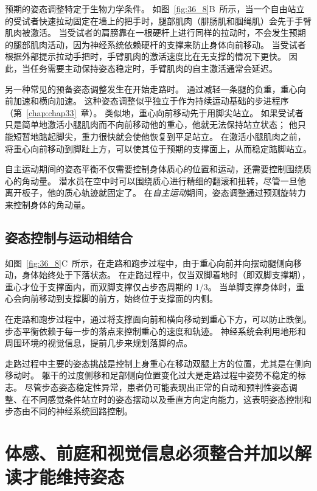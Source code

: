 预期的姿态调整特定于生物力学条件。
如图~\ref{fig:36_8}B~所示，当一个自由站立的受试者快速拉动固定在墙上的把手时，腿部肌肉（腓肠肌和腘绳肌）会先于手臂肌肉被激活。
当受试者的肩膀靠在一根硬杆上进行同样的拉动时，不会发生预期的腿部肌肉活动，因为神经系统依赖硬杆的支撑来防止身体向前移动。
当受试者根据外部提示拉动手把时，手臂肌肉的激活速度比在无支撑的情况下更快。
因此，当任务需要主动保持姿态稳定时，手臂肌肉的自主激活通常会延迟。


另一种常见的预备姿态调整发生在开始走路时。
通过减轻一条腿的负重，重心向前加速和横向加速。
这种姿态调整似乎独立于作为持续运动基础的步进程序（第~\ref{chap:chap33}~章）。
类似地，重心向前移动先于用脚尖站立。
如果受试者只是简单地激活小腿肌肉而不向前移动他的重心，他就无法保持站立状态；
他只能短暂地踮起脚尖，重力很快就会使他恢复到平足站立。
在激活小腿肌肉之前，将重心向前移动到脚趾上方，可以使其位于预期的支撑面上，从而稳定踮脚站立。


自主运动期间的姿态平衡不仅需要控制身体质心的位置和运动，还需要控制围绕质心的角动量。
潜水员在空中时可以围绕质心进行精细的翻滚和扭转，尽管一旦他离开板子，他的质心轨迹就固定了。
在\textit{自主运动}期间，姿态调整通过预测旋转力来控制身体的角动量。



\subsection{姿态控制与运动相结合}

如图~\ref{fig:36_8}C~所示，在走路和跑步过程中，由于重心向前并向摆动腿侧向移动，身体始终处于下落状态。
在走路过程中，仅当双脚着地时（即双脚支撑期），重心才位于支撑面内，而双脚支撑仅占步态周期的 1/3。
当单脚支撑身体时，重心会向前移动到支撑脚的前方，始终位于支撑面的内侧。


在走路和跑步过程中，通过将支撑面向前和横向移动到重心下方，可以防止跌倒。
步态平衡依赖于每一步的落点来控制重心的速度和轨迹。
神经系统会利用地形和周围环境的视觉信息，提前几步来规划落脚的点。


走路过程中主要的姿态挑战是控制上身重心在移动双腿上方的位置，尤其是在侧向移动时。
躯干的过度侧移和足部侧向位置变化过大是走路过程中姿势不稳定的标志。
尽管步态姿态稳定性异常，患者仍可能表现出正常的自动和预判性姿态调整、在不同感觉条件站立时的姿态摆动以及垂直方向定向能力，这表明姿态控制和步态由不同的神经系统回路控制。



\section{体感、前庭和视觉信息必须整合并加以解读才能维持姿态}

